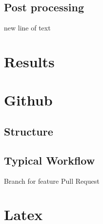 \subsection{Post processing}

new line of text

\section{Results}


\appendix
\section{Github}
\subsection{Structure}
\subsection{Typical Workflow}
Branch for feature
Pull Request

\section{Latex}

\section{}

